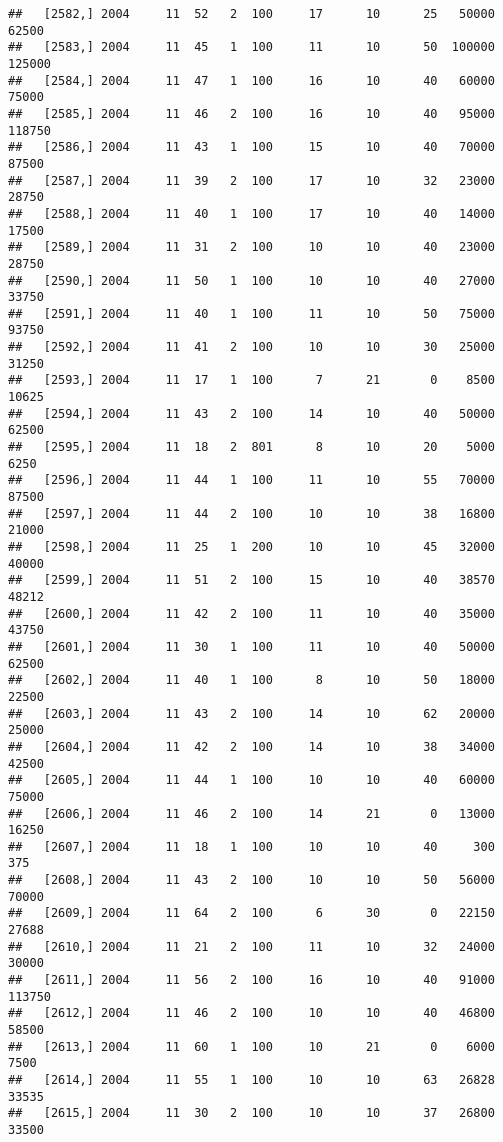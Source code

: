 \documentclass{article}\usepackage[]{graphicx}\usepackage[]{color}
\makeatletter
\newenvironment{kframe}{%
 \def\at@end@of@kframe{}%
 \ifinner\ifhmode%
  \def\at@end@of@kframe{\end{minipage}}%
  \begin{minipage}{\columnwidth}%
 \fi\fi%
 \def\FrameCommand##1{\hskip\@totalleftmargin \hskip-\fboxsep
 \colorbox{shadecolor}{##1}\hskip-\fboxsep
     \hskip-\linewidth \hskip-\@totalleftmargin \hskip\columnwidth}%
 \MakeFramed {\advance\hsize-\width
   \@totalleftmargin\z@ \linewidth\hsize
   \@setminipage}}%
 {\par\unskip\endMakeFramed%
 \at@end@of@kframe}
\newenvironment{knitrout}{}{} %
\makeatother
\begin{document}
\begin{knitrout}
\begin{kframe}
\begin{verbatim}
##   [2582,] 2004     11  52   2  100     17      10      25   50000   62500
##   [2583,] 2004     11  45   1  100     11      10      50  100000  125000
##   [2584,] 2004     11  47   1  100     16      10      40   60000   75000
##   [2585,] 2004     11  46   2  100     16      10      40   95000  118750
##   [2586,] 2004     11  43   1  100     15      10      40   70000   87500
##   [2587,] 2004     11  39   2  100     17      10      32   23000   28750
##   [2588,] 2004     11  40   1  100     17      10      40   14000   17500
##   [2589,] 2004     11  31   2  100     10      10      40   23000   28750
##   [2590,] 2004     11  50   1  100     10      10      40   27000   33750
##   [2591,] 2004     11  40   1  100     11      10      50   75000   93750
##   [2592,] 2004     11  41   2  100     10      10      30   25000   31250
##   [2593,] 2004     11  17   1  100      7      21       0    8500   10625
##   [2594,] 2004     11  43   2  100     14      10      40   50000   62500
##   [2595,] 2004     11  18   2  801      8      10      20    5000    6250
##   [2596,] 2004     11  44   1  100     11      10      55   70000   87500
##   [2597,] 2004     11  44   2  100     10      10      38   16800   21000
##   [2598,] 2004     11  25   1  200     10      10      45   32000   40000
##   [2599,] 2004     11  51   2  100     15      10      40   38570   48212
##   [2600,] 2004     11  42   2  100     11      10      40   35000   43750
##   [2601,] 2004     11  30   1  100     11      10      40   50000   62500
##   [2602,] 2004     11  40   1  100      8      10      50   18000   22500
##   [2603,] 2004     11  43   2  100     14      10      62   20000   25000
##   [2604,] 2004     11  42   2  100     14      10      38   34000   42500
##   [2605,] 2004     11  44   1  100     10      10      40   60000   75000
##   [2606,] 2004     11  46   2  100     14      21       0   13000   16250
##   [2607,] 2004     11  18   1  100     10      10      40     300     375
##   [2608,] 2004     11  43   2  100     10      10      50   56000   70000
##   [2609,] 2004     11  64   2  100      6      30       0   22150   27688
##   [2610,] 2004     11  21   2  100     11      10      32   24000   30000
##   [2611,] 2004     11  56   2  100     16      10      40   91000  113750
##   [2612,] 2004     11  46   2  100     10      10      40   46800   58500
##   [2613,] 2004     11  60   1  100     10      21       0    6000    7500
##   [2614,] 2004     11  55   1  100     10      10      63   26828   33535
##   [2615,] 2004     11  30   2  100     10      10      37   26800   33500

\end{verbatim}
\end{kframe}
\end{knitrout}
\end{document}

